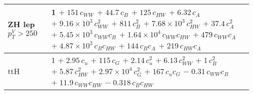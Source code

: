 \begin{tabular}{l|p{}}
    ZH lep $p_{T}^{V} > 250$ & 1 $+\;151\,c_{WW}$ $+\;44.7\,c_{B}$ $+\;125\,c_{HW}$ $+\;6.32\,c_{A}$ $+\;9.16\times 10^{3}\,c_{WW}^{2}$ $+\;811\,c_{B}^{2}$ $+\;7.68\times 10^{3}\,c_{HW}^{2}$ $+\;37.4\,c_{A}^{2}$ $+\;5.45\times 10^{3}\,c_{WW}c_{B}$ $+\;1.64\times 10^{4}\,c_{WW}c_{HW}$ $+\;479\,c_{WW}c_{A}$ $+\;4.87\times 10^{3}\,c_{B}c_{HW}$ $+\;144\,c_{B}c_{A}$ $+\;219\,c_{HW}c_{A}$ \\
    \hline
    ttH & 1 $+\;2.95\,c_{u}$ $+\;115\,c_{G}$ $+\;2.14\,c_{u}^{2}$ $+\;6.13\,c_{WW}^{2}$ $+\;1\,c_{B}^{2}$ $+\;5.87\,c_{HW}^{2}$ $+\;2.97\times 10^{4}\,c_{G}^{2}$ $+\;167\,c_{u}c_{G}$ $-\;0.31\,c_{WW}c_{B}$ $+\;11.9\,c_{WW}c_{HW}$ $-\;0.318\,c_{B}c_{HW}$ \\
\end{tabular}